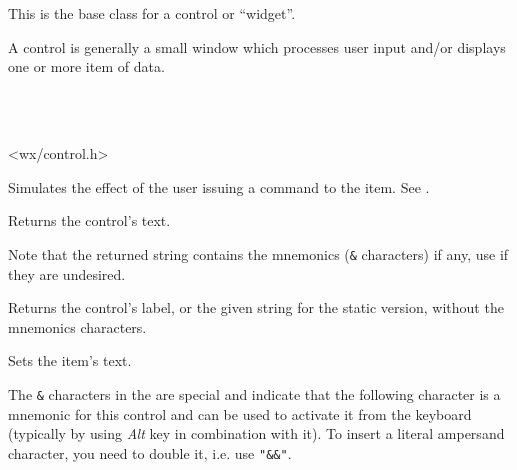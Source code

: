 \section{}\label{wxcontrol}

This is the base class for a control or ``widget''.

A control is generally a small window which processes user input and/or
displays one or more item of data.


\\
\\


<wx/control.h>







\label{wxcontrolcommand}


Simulates the effect of the user issuing a command to the item. See .


\label{wxcontrolgetlabel}


Returns the control's text.

Note that the returned string contains the mnemonics (\texttt{\&} characters) if
any, use  if they are
undesired.


\label{wxcontrolgetlabeltext}



Returns the control's label, or the given  string for the static
version, without the mnemonics characters.


\label{wxcontrolsetlabel}


Sets the item's text.

The \texttt{\&} characters in the  are special and indicate that the
following character is a mnemonic for this control and can be used to activate
it from the keyboard (typically by using \textit{Alt} key in combination with
it). To insert a literal ampersand character, you need to double it, i.e. use 
\texttt{"\&\&"}.


